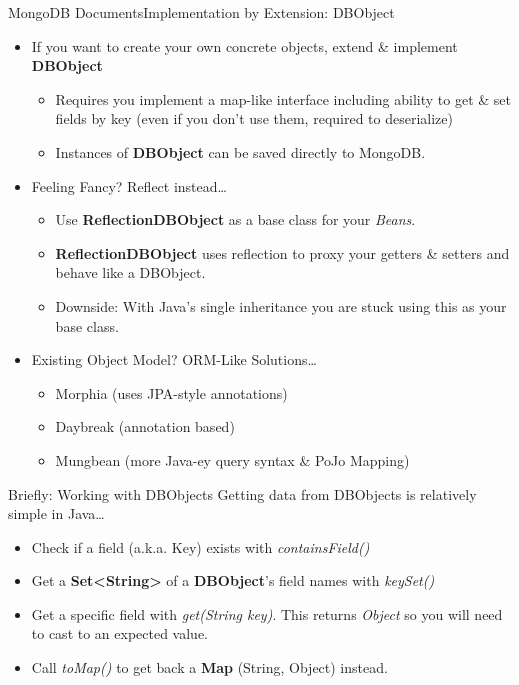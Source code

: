 \documentclass{beamer}
\begin{document}
\begin{frame}{MongoDB Documents}{Implementation by Extension: DBObject}
    \begin{itemize}
        \item<1-> If you want to create your own concrete objects, extend \& implement {\bf DBObject}
            \begin{itemize}
                \item Requires you implement a map-like interface including ability to get \& set fields by key (even if you don't use them, required to deserialize)
                \item Instances of {\bf DBObject} can be saved directly to MongoDB.
            \end{itemize}
        \item<2-> Feeling Fancy? Reflect instead\dots
            \begin{itemize}
                \item Use {\bf ReflectionDBObject} as a base class for your {\em Beans}.
                \item {\bf ReflectionDBObject} uses reflection to proxy your getters \& setters and behave like a DBObject.
                \item Downside: With Java's single inheritance you are stuck using this as your base class.
            \end{itemize}
        \item<3-> Existing Object Model? ORM-Like Solutions\ldots
            \begin{itemize}
                \item Morphia (uses JPA-style annotations)
                \item Daybreak (annotation based)
                \item Mungbean (more Java-ey query syntax & PoJo Mapping)
            \end{itemize}
              
    \end{itemize}
\end{frame}

\begin{frame}{Briefly: Working with DBObjects}
    Getting data from DBObjects is relatively simple in Java\ldots
    \begin{itemize}
        \item<2-> Check if a field (a.k.a. Key) exists with {\em containsField()}
        \item<3-> Get a {\bf Set<String>} of a {\bf DBObject}'s field names with {\em keySet()}
        \item<4-> Get a specific field with {\em get(String key)}.  This returns {\em Object} so you will need to cast to an expected value.
        \item<5-> Call {\em toMap()} to get back a {\bf Map} (String, Object) instead.
    \end{itemize}
\end{frame}
\end{document}
